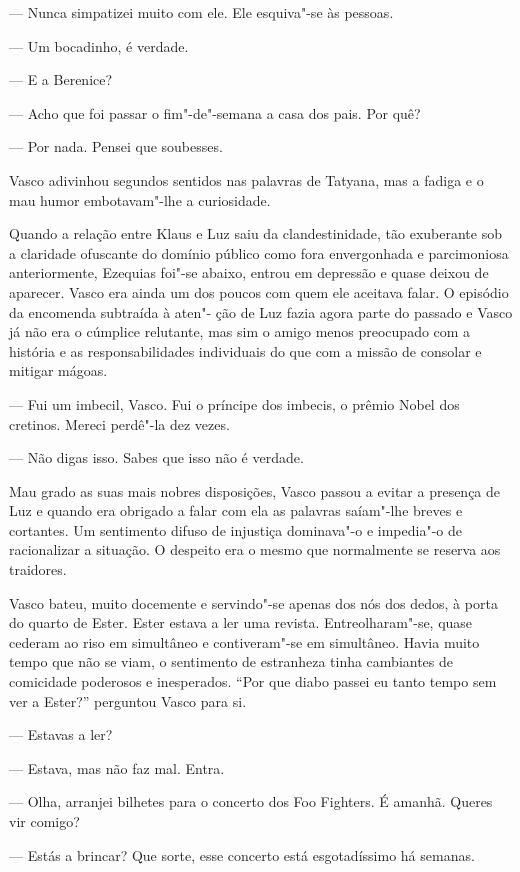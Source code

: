 --- Nunca simpatizei muito com ele. Ele esquiva"-se às pessoas.

--- Um bocadinho, é verdade.

--- E a Berenice?

--- Acho que foi passar o fim"-de"-semana a casa dos pais.
Por quê?

--- Por nada. Pensei que soubesses.


Vasco adivinhou segundos sentidos nas palavras de Tatyana, mas a
fadiga e o mau humor embotavam"-lhe a curiosidade.

Quando a relação entre
Klaus e Luz saiu da clandestinidade, tão exuberante sob a claridade
ofuscante do domínio público como fora envergonhada e parcimoniosa
anteriormente, Ezequias foi"-se abaixo, entrou em depressão e quase
deixou de aparecer. Vasco era ainda um dos poucos com quem ele aceitava
falar. O episódio da encomenda subtraída à aten"- ção de Luz fazia agora
parte do passado e Vasco já não era o cúmplice relutante, mas sim o
amigo menos preocupado com a história e as responsabilidades individuais
do que com a missão de consolar e mitigar mágoas.

--- Fui um imbecil, Vasco. Fui o príncipe dos imbecis, o prêmio Nobel dos
  cretinos. Mereci perdê"-la dez vezes.


--- Não digas isso. Sabes que isso não é verdade.


Mau grado as suas mais nobres disposições, Vasco passou a evitar a
presença de Luz e quando era obrigado a falar com ela as palavras
saíam"-lhe breves e cortantes. Um sentimento difuso de injustiça
dominava"-o e impedia"-o de racionalizar a situação. O despeito era o
mesmo que normalmente se reserva aos traidores.

Vasco bateu, muito docemente e servindo"-se apenas dos nós dos dedos, à
porta do quarto de Ester. Ester estava a ler uma revista.
Entreolharam"-se, quase cederam ao riso em simultâneo e contiveram"-se
em simultâneo. Havia muito tempo que não se viam, o sentimento de
estranheza tinha cambiantes de comicidade poderosos e inesperados. ``Por
que diabo passei eu tanto tempo sem ver a Ester?'' perguntou Vasco para
si.

--- Estavas a ler?

--- Estava, mas não faz mal. Entra.

--- Olha, arranjei bilhetes para o concerto dos Foo Fighters. É amanhã.
  Queres vir comigo?

--- Estás a brincar? Que sorte, esse concerto está esgotadíssimo há
  semanas.

